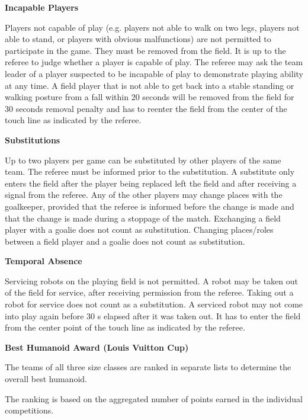 \bigskip

{\bfseries Incapable Players}

Players not capable of play (e.g. players not able to walk on two legs, players not able to stand, or players with obvious malfunctions) are not permitted to participate in the game. They must be removed from the field. It is up to the referee to judge whether a player is capable of play. The referee may ask the team leader of a player suspected to be incapable of play to demonstrate playing ability at any time. A field player that is not able to get back into a stable standing or walking posture from a fall within 20 seconds will be removed from the field for 30 seconds removal penalty and has to reenter the field from the center of the touch line as indicated by the
referee.

\bigskip

{\bfseries Substitutions}

Up to two players per game can be substituted by other players of the same team. The referee must be informed prior to the substitution. A substitute only enters the field after the player being replaced left the field and after receiving a signal from the referee. Any of the
other players may change places with the goalkeeper, provided that the referee is informed before the change is made and that the change is made during a stoppage of the match. Exchanging a field player with a goalie does not count as substitution. Changing places/roles between a
field player and a goalie does not count as substitution.

\bigskip

{\bfseries Temporal Absence}

Servicing robots on the playing field is not permitted. A robot may be taken out of the field for service, after receiving permission from the referee. Taking out a robot for service does not count as a substitution. A serviced robot may not come into play again before 30 s elapsed after it was taken out. It has to enter the field from the
center point of the touch line as indicated by the referee.

\bigskip

{\bfseries Best Humanoid Award (Louis Vuitton Cup)}

\headlinebox
 
The teams of all three size classes are ranked in separate lists to determine the overall best humanoid.

The ranking is based on the aggregated number of points earned in the individual competitions.

